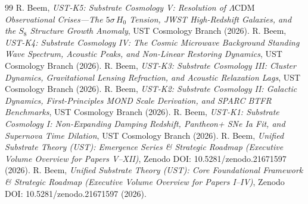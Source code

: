 \documentclass[11pt,a4paper]{article}
\begin{document}
	\begin{thebibliography}{99}
		 R. Beem, \textit{UST-K5: Substrate Cosmology V: Resolution of $\Lambda\text{CDM}$ Observational Crises---The $5\sigma \, H_0$ Tension, JWST High-Redshift Galaxies, and the $S_8$ Structure Growth Anomaly}, UST Cosmology Branch (2026).
		 R. Beem, \textit{UST-K4: Substrate Cosmology IV: The Cosmic Microwave Background Standing Wave Spectrum, Acoustic Peaks, and Non-Linear Restoring Dynamics}, UST Cosmology Branch (2026).
		 R. Beem, \textit{UST-K3: Substrate Cosmology III: Cluster Dynamics, Gravitational Lensing Refraction, and Acoustic Relaxation Lags}, UST Cosmology Branch (2026).
		 R. Beem, \textit{UST-K2: Substrate Cosmology II: Galactic Dynamics, First-Principles MOND Scale Derivation, and SPARC BTFR Benchmarks}, UST Cosmology Branch (2026).
		 R. Beem, \textit{UST-K1: Substrate Cosmology I: Non-Expanding Damping Redshift, Pantheon+ SNe Ia Fit, and Supernova Time Dilation}, UST Cosmology Branch (2026).
		 R. Beem, \textit{Unified Substrate Theory (UST): Emergence Series \& Strategic Roadmap (Executive Volume Overview for Papers V--XII)}, Zenodo DOI: 10.5281/zenodo.21671597 (2026).
		 R. Beem, \textit{Unified Substrate Theory (UST): Core Foundational Framework \& Strategic Roadmap (Executive Volume Overview for Papers I--IV)}, Zenodo DOI: 10.5281/zenodo.21671597 (2026).
	\end{thebibliography}
	
\end{document}
